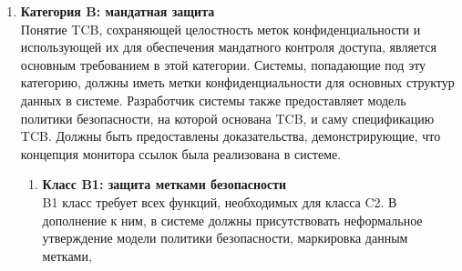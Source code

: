 \begin{enumerate}
\begin{enumerate}
\begin{enumerate}
\begin{enumerate}
\begin{itemize}
					некоторым подмножеством объектов и субъектов в компьютерной системе. TCB должен изолировать защищаемые ресурсы таким образом, чтобы на них распространялись требования контроля
					доступа и аудита.
					\item{\textbf{Целостность системы}}\\
					Должны быть предусмотрены аппаратные и/или программные средства, которые могут использоваться для периодической проверки правильности работы аппаратных и программных элементов TCB.
				\end{itemize}
				\item{\textbf{Гарантия жизненного цикла}}
				\begin{itemize}
					\item{\textbf{Тестирование безопасности}}\\
					Защитные механизмы должны быть протестированы и проверены на работоспособность в соответствии с сопроводительной документацией на компьютерную систему.
					Тестирование проводится с целью удостоверения в отсутствии способов обхода неавторизованным пользователем защитных механизмов TCB. Тестирование должно также включать в себя
					поиск уязвимостей, позволяющих нарушить изоляцию ресурсов или получить несанкционированный доступ к журналам аудита или к данным аутентификации.
				\end{itemize}
			\end{enumerate}
		\end{enumerate}
	\end{enumerate}
	\item{\textbf{Категория B: мандатная защита}}\\
	Понятие TCB, сохраняющей целостность меток конфиденциальности и использующей их для обеспечения мандатного контроля доступа, является основным требованием в этой категории. Системы, попадающие
	под эту категорию, должны иметь метки конфиденциальности для основных структур данных в системе. Разработчик системы также предоставляет модель политики безопасности, на которой основана TCB, и
	саму спецификацию TCB. Должны быть предоставлены доказательства, демонстрирующие, что концепция монитора ссылок была реализована в системе.
	\begin{enumerate}
		\item{\textbf{Класс B1: защита метками безопасности}}\\
		B1 класс требует всех функций, необходимых для класса C2. В дополнение к ним, в системе должны присутствовать неформальное утверждение модели политики безопасности, маркировка данным метками,

\end{enumerate}
\end{enumerate}
